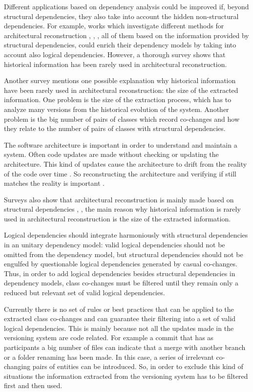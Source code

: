 \documentclass[12pt, a4paper, twoside]{report}
\begin{document}
Different applications based on dependency analysis could be improved if, beyond structural dependencies, they also take into account the hidden non-structural dependencies. For example, works  which investigate different methods for architectural reconstruction \cite{SoraConti}, \cite{SoraSem13}, \cite{PagerankENASE},  all of them based on the information provided by structural dependencies, could enrich their dependency models by taking into account also logical dependencies. However, a thorough survey \cite{sar} shows that historical information has been rarely used in architectural reconstruction. 

Another survey \cite{Shtern:2012:CMS:2332427.2332428} mentions one possible explanation why historical information have been rarely used in architectural reconstruction: the size of the extracted information. One problem is the size of the extraction process, which has to analyze many versions from the historical evolution of the system. Another problem is the big number of pairs of classes which record co-changes and how they relate to the number of pairs of classes with structural dependencies.

The software architecture is important in order to understand and maintain a system. Often code updates are made without checking or updating the architecture. This kind of updates cause the architecture to drift from the reality of the code over time \cite{sar}.
So reconstructing the architecture and verifying if still matches the reality is important \cite{Kalliamvakou2016}. 

Surveys also show that architectural reconstruction is mainly made based on structural dependencies \cite{Shtern:2012:CMS:2332427.2332428}, \cite{sar}, the main reason why historical information is rarely used in architectural reconstruction is the size of the extracted information.

Logical dependencies should integrate harmoniously with structural dependencies in an unitary dependency model: valid logical dependencies should not be omitted from the dependency model, but structural dependencies should not be engulfed by questionable logical dependencies generated by casual co-changes.  
Thus, in order to add logical dependencies besides structural dependencies in dependency models, class co-changes must be filtered until they remain only a reduced but relevant set of valid logical dependencies. 

Currently there is no set of rules or best practices that can be applied to the extracted class co-changes and can guarantee their filtering into a set of valid logical dependencies.
This is mainly because not all the updates made in the versioning system are code related. For example a commit that has as participants a big number of files can indicate that a merge with another branch or a folder renaming has been made. In this case, a series of irrelevant co-changing pairs of entities can be introduced. So, in order to exclude this kind of situations the information extracted from the versioning system has to be filtered first and then used.
\end{document}
